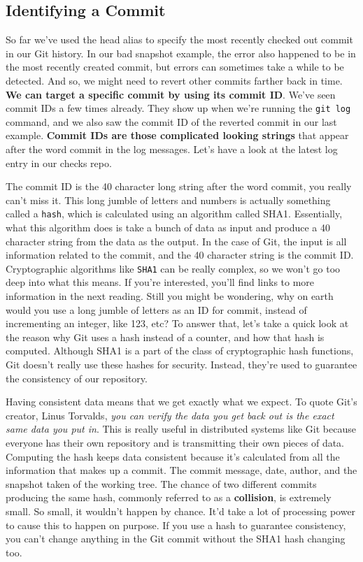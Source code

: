 	\subsection{Identifying a Commit}	
	
	So far we've used the head alias to specify the most recently checked out commit in our Git history. In our bad snapshot example, the error also happened to be in the most recently created commit, but errors can sometimes take a while to be detected. And so, we might need to revert other commits farther back in time. \textbf{We can target a specific commit by using its commit ID}. We've seen commit IDs a few times already. They show up when we're running the \texttt{git log} command, and we also saw the commit ID of the reverted commit in our last example.\textbf{ Commit IDs are those complicated looking strings} that appear after the word commit in the log messages. Let's have a look at the latest log entry in our checks repo.

	The commit ID is the 40 character long string after the word commit, you really can't miss it. This long jumble of letters and numbers is actually something called a \texttt{hash}, which is calculated using an algorithm called SHA1. Essentially, what this algorithm does is take a bunch of data as input and produce a 40 character string from the data as the output. In the case of Git, the input is all information related to the commit, and the 40 character string is the commit ID. Cryptographic algorithms like \texttt{SHA1} can be really complex, so we won't go too deep into what this means. If you're interested, you'll find links to more information in the next reading. Still you might be wondering, why on earth would you use a long jumble of letters as an ID for commit, instead of incrementing an integer, like 123, etc? To answer that, let's take a quick look at the reason why Git uses a hash instead of a counter, and how that hash is computed. Although SHA1 is a part of the class of cryptographic hash functions, Git doesn't really use these hashes for security. Instead, they're used to guarantee the consistency of our repository.
	
	Having consistent data means that we get exactly what we expect. To quote Git's creator, Linus Torvalds,\textit{ you can verify the data you get back out is the exact same data you put in}. This is really useful in distributed systems like Git because everyone has their own repository and is transmitting their own pieces of data. Computing the hash keeps data consistent because it's calculated from all the information that makes up a commit. The commit message, date, author, and the snapshot taken of the working tree. The chance of two different commits producing the same hash, commonly referred to as a \textbf{collision}, is extremely small. So small, it wouldn't happen by chance. It'd take a lot of processing power to cause this to happen on purpose. If you use a hash to guarantee consistency, you can't change anything in the Git commit without the SHA1 hash changing too.
	
